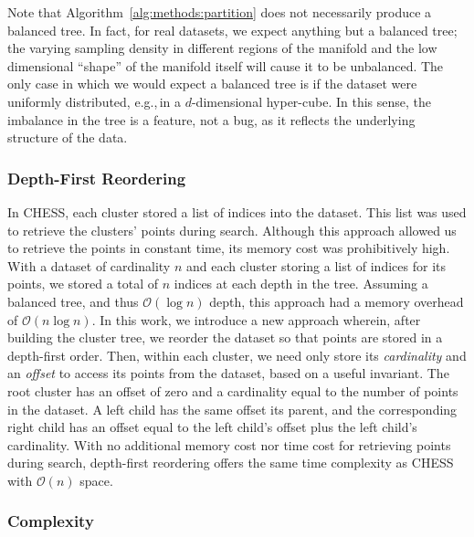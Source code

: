 Note that Algorithm~\ref{alg:methods:partition} does not necessarily produce a balanced tree.
In fact, for real datasets, we expect anything but a balanced tree; the varying sampling density in different regions of the manifold and the low dimensional ``shape'' of the manifold itself will cause it to be unbalanced.
The only case in which we would expect a balanced tree is if the dataset were uniformly distributed, e.g.,\,in a $d$-dimensional hyper-cube.
In this sense, the imbalance in the tree is a feature, not a bug, as it reflects the underlying structure of the data.


\subsubsection{Depth-First Reordering}
\label{sec:methods:clustering:depth-first-reordering}


In CHESS, each cluster stored a list of indices into the dataset.
This list was used to retrieve the clusters' points during search.
Although this approach allowed us to retrieve the points in constant time, its memory cost was prohibitively high.
With a dataset of cardinality $n$ and each cluster storing a list of indices for its points, we stored a total of $n$ indices at each depth in the tree.
Assuming a balanced tree, and thus $\mathcal{O}(\log n)$ depth, this approach had a memory overhead of $\mathcal{O}(n \log n)$.
In this work, we introduce a new approach wherein, after building the cluster tree, we reorder the dataset so that points are stored in a depth-first order.
Then, within each cluster, we need only store its \textit{cardinality} and an \textit{offset} to access its points from the dataset, based on a useful invariant.
The root cluster has an offset of zero and a cardinality equal to the number of points in the dataset.
A left child has the same offset its parent, and the corresponding right child has an offset equal to the left child's offset plus the left child's cardinality.
With no additional memory cost nor time cost for retrieving points during search, depth-first reordering offers the same time complexity as CHESS with $\mathcal{O}(n)$ space.


\subsubsection{Complexity}
\label{sec:methods:clustering:complexity}

